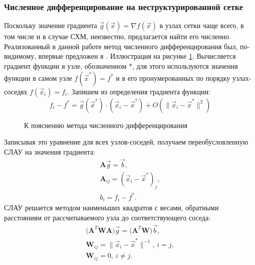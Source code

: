 \subsubsection{Численное дифференцирование на неструктурированной сетке}
Поскольку значение градиента $\vec{g}(\vec{x}) = \nabla f(\vec{x})$ в узлах сетки чаще всего, 
в том числе и в случае СХМ, неизвестно, предлагается найти его численно. 
Реализованный в данной работе метод численного дифференцирования был, 
по-видимому, впервые предложен в \cite{sibson}. 
Иллюстрация на рисунке \ref{pic:gradient}. Вычисляется градиент функции в узле, 
обозначенном $*$, для этого используются значения функции в самом узле $f(\vec{x}^{*}) = f^{*}$ и в его 
пронумерованных по порядку узлах-соседях $f(\vec{x}_i) = f_i$. Запишем из определения градиента функции:
\begin{equation}
f_i - f^{*} = \vec{g}(\vec{x}^*) \cdot (\vec{x}_i - \vec{x}^{*}) + O( \lVert \vec{x}_i - \vec{x}^{*} \rVert ^2)
\end{equation}
\begin{figure}[H]
	\caption{К пояснению метода численного дифференцирования}
	\label{pic:gradient}
\end{figure}
Записывая это уравнение для всех узлов-соседей, получаем переобусловленную СЛАУ на значения градиента:
\begin{eqnarray}
\mathbf{A}\vec{g} = \vec{b}, \\
\mathbf{A}_{ij} = (\vec{x}_i - \vec{x}^{*})_j, \\
b_i = f_i - f^{*}.
\end{eqnarray}
СЛАУ решается методом наименьших квадратов с весами, 
обратными расстояниям от рассчитываемого узла до соответствующего соседа:
\begin{eqnarray}
\Big( \mathbf{A}^T \mathbf{W} \mathbf{A} \Big) \vec{g} = \Big( \mathbf{A}^T \mathbf{W} \Big) \vec{b}, \\
\mathbf{W}_{ij} = \lVert \vec{x}_i - \vec{x}^{*} \rVert ^{-1}, \ i = j, \\
\mathbf{W}_{ij} = 0, \ i \neq j.
\end{eqnarray}

